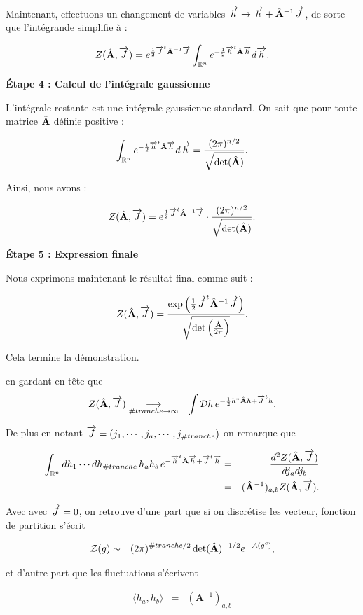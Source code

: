 {Maintenant, effectuons un changement de variables \( \mathbf{\overrightarrow{h}} \to \mathbf{\overrightarrow{h}} + \hat{\mathbf{A}}^{-1} \mathbf{\overrightarrow{J}} \), de sorte que l'intégrande simplifie à :

\[
Z(\hat{\mathbf{A}}, \mathbf{\overrightarrow{J}}) = e^{\frac{1}{2} \mathbf{\overrightarrow{J}}^t \hat{\mathbf{A}}^{-1} \mathbf{\overrightarrow{J}}} \int_{\mathbb{R}^n} e^{-\frac{1}{2} \mathbf{\overrightarrow{h}}^t \hat{\mathbf{A}} \mathbf{\overrightarrow{h}}} d\mathbf{\overrightarrow{h}}.
\]

\textbf{Étape 4 : Calcul de l'intégrale gaussienne}

L'intégrale restante est une intégrale gaussienne standard. On sait que pour toute matrice \( \hat{\mathbf{A}} \) définie positive :

\[
\int_{\mathbb{R}^n} e^{-\frac{1}{2} \mathbf{\overrightarrow{h}}^t \hat{\mathbf{A}} \mathbf{\overrightarrow{h}}} d\mathbf{\overrightarrow{h}} = \frac{(2\pi)^{n/2}}{\sqrt{\det(\hat{\mathbf{A}})}}.
\]

Ainsi, nous avons :

\[
Z(\hat{\mathbf{A}}, \mathbf{\overrightarrow{J}}) = e^{\frac{1}{2} \mathbf{\overrightarrow{J}}^t \hat{\mathbf{A}}^{-1} \mathbf{\overrightarrow{J}}} \cdot \frac{(2\pi)^{n/2}}{\sqrt{\det(\hat{\mathbf{A}})}}.
\]

\textbf{Étape 5 : Expression finale}

Nous exprimons maintenant le résultat final comme suit :

\[
Z(\hat{\mathbf{A}}, \mathbf{\overrightarrow{J}}) = \frac{\exp\left( \frac{1}{2} \mathbf{\overrightarrow{J}}^t \hat{\mathbf{A}}^{-1} \mathbf{\overrightarrow{J}} \right)}{\sqrt{\det \left( \frac{\hat{\mathbf{A}}}{2\pi} \right)}}.
\]

Cela termine la démonstration.



}

en gardant en tête que 
\begin{eqnarray}
	Z(\hat{\mathbf{A}} , \mathbf{\overrightarrow{J}})	 &\underset{ \#tranche \to \infty}{\longrightarrow} & \int \mathcal{D}h \, e^{-\frac{1}{2}h^\ast\hat{\mathbf{A}}h + \mathbf{\overrightarrow{J}}^t h}.	
\end{eqnarray}
 

De plus en notant $\mathbf{\overrightarrow{J}} = ( j_1 , \cdots , j_a , \cdots , j_{\#tranche} ) $ on remarque que  

\begin{eqnarray}
	\int_{\mathbb{R}^n} dh_1 \cdots dh_{\#tranche} \,  h_a h_b \,  	e^{-\vect{h}^t\operator{A} \vect{h} + \vect{J}^t \vect{h} } & = &  \frac{ d^2 	Z(\operator{A} , \vect{J})	}{d j_a d j_b }\\
	 & = & ( \operator{A}^{-1} )_{a,b}  Z(\operator{A} , \vect{J}).	
\end{eqnarray}

\begin{aff}
Avec avec $\mathbf{\overrightarrow{J}} = 0 $, on retrouve d'une part que si on discrétise les vecteur, fonction de partition s'écrit  

\begin{eqnarray}
	\mathcal{Z}(g) & \sim &  (2 \pi)^{\#tranche/2}  \det ( \hat{\mathbf{A}} )^{-1/2}e^{-\mathcal{A}(g^c)}, 		
\end{eqnarray}

et d'autre part que les fluctuations s'écrivent 

\begin{eqnarray}
	\langle h_a , h_b \rangle & = & 	( \mathbf{A}^{-1} )_{a,b}
\end{eqnarray}
\end{aff}


